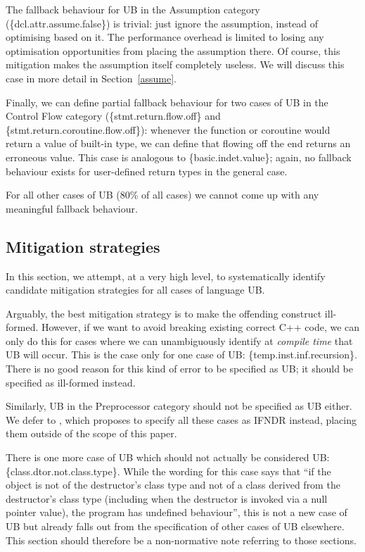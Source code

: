 The fallback behaviour for UB in the Assumption category (\{dcl.attr.assume.false\}) is trivial: just ignore the assumption, instead of optimising based on it. The performance overhead is limited to losing any optimisation opportunities from placing the assumption there. Of course, this mitigation makes the assumption itself completely useless. We will discuss this case in more detail in Section~\ref{assume}.

Finally, we can define partial fallback behaviour for two cases of UB in the Control Flow category  (\{stmt.return.flow.off\} and \{stmt.return.coroutine.flow.off\}): whenever the function or coroutine would return a value of built-in type, we can define that flowing off the end returns an erroneous value. This case is analogous to \{basic.indet.value\}; again, no fallback behaviour exists for user-defined return types in the general case.

For all other cases of UB (80\% of all cases) we cannot come up with any meaningful fallback behaviour.

\subsection{Mitigation strategies}
\label{mitigation}

In this section, we attempt, at a very high level, to systematically identify candidate mitigation strategies for all cases of language UB.

Arguably, the best mitigation strategy is to make the offending construct ill-formed. However, if we want to avoid breaking existing correct C++ code, we can only do this for cases where we can unambiguously identify at \emph{compile time} that UB will occur. This is the case only for one case of UB: 
\{temp.inst.inf.recursion\}. There is no good reason for this kind of error to be specified as UB; it should be specified as ill-formed instead.

Similarly, UB in the Preprocessor category should not be specified as UB either. We defer to \cite{P2843R2}, which proposes to specify all these cases as IFNDR instead, placing them outside of the scope of this paper.

There is one more case of UB which should not actually be considered UB: \{class.dtor.not.class.type\}. While the wording for this case says that ``if the object is not of the destructor's class type and not of a class derived from the destructor's class type (including when the destructor is invoked via a null pointer value), the program has undefined behaviour'', this is not a new case of UB but already falls out from the specification of other cases of UB elsewhere. This section should therefore be a non-normative note referring to those sections.

